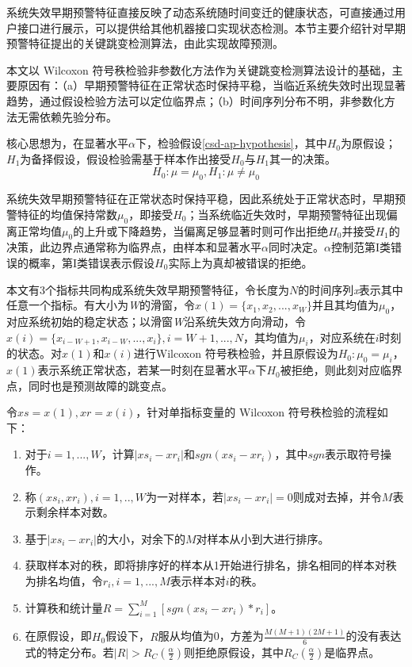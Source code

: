 系统失效早期预警特征直接反映了动态系统随时间变迁的健康状态，可直接通过用户接口进行展示，可以提供给其他机器接口实现状态检测。本节主要介绍针对早期预警特征提出的关键跳变检测算法，由此实现故障预测。

本文以 Wilcoxon 符号秩检验非参数化方法作为关键跳变检测算法设计的基础，主要原因有：（a）早期预警特征在正常状态时保持平稳，当临近系统失效时出现显著趋势，通过假设检验方法可以定位临界点；（b）时间序列分布不明，非参数化方法无需依赖先验分布。

核心思想为，在显著水平$\alpha$下，检验假设\ref{csd-ap-hypothesis}，其中$H_{0}$为原假设；$H_{1}$为备择假设，假设检验需基于样本作出接受$H_{0}$与$H_{1}$其一的决策。
\begin{equation}
\label{csd-ap-hypothesis}
H_{0}: \mu = \mu_{0}, H_{1}:\mu \neq \mu_{0}
\end{equation}

系统失效早期预警特征在正常状态时保持平稳，因此系统处于正常状态时，早期预警特征的均值保持常数$\mu_{0}$，即接受$H_{0}$；当系统临近失效时，早期预警特征出现偏离正常均值$\mu_{0}$的上升或下降趋势，当偏离足够显著时则可作出拒绝$H_{0}$并接受$H_{1}$的决策，此边界点通常称为{\heiti 临界点}，由样本和显著水平$\alpha$同时决定。$\alpha$控制范第I类错误的概率，第I类错误表示假设$H_{0}$实际上为真却被错误的拒绝。

本文有3个指标共同构成系统失效早期预警特征，令长度为$N$的时间序列\emph{x}表示其中任意一个指标。有大小为\emph{W}的滑窗，令$x(1) = \{x_{1}, x_{2}, ..., x_{W}\}$并且其均值为$\mu_{0}$，对应系统初始的稳定状态；以滑窗\emph{W}沿系统失效方向滑动，令$x(i) = \{x_{i-W+1}, x_{i-W}, ..., x_{i}\}, i=W+1,...,N$，其均值为$\mu_{i}$，对应系统在$i$时刻的状态。对$x(1)$和$x(i)$进行Wilcoxon 符号秩检验，并且原假设为$H_{0}: \mu_{0}=\mu_{i}$，$x(1)$表示系统正常状态，若某一时刻在显著水平$\alpha$下$H_{0}$被拒绝，则此刻对应临界点，同时也是预测故障的跳变点。

令$xs = x(1), xr=x(i)$，针对单指标变量的 Wilcoxon 符号秩检验的流程如下：
\begin{enumerate}[1.]
  \item 对于$i=1,...,W$，计算$|xs_{i}-xr_{i}|$和$sgn(xs_{i}-xr_{i})$，其中$sgn$表示取符号操作。
  \item 称$(xs_{i}, xr_{i}), i=1,..,W$为一对样本，若$|xs_{i}-xr_{i}|=0$则成对去掉，并令$M$表示剩余样本对数。
  \item 基于$|xs_{i}-xr_{i}|$的大小，对余下的$M$对样本从小到大进行排序。
  \item 获取样本对的秩，即将排序好的样本从1开始进行排名，排名相同的样本对秩为排名均值，令$r_{i}, i=1,...,M$表示样本对$i$的秩。
  \item 计算秩和统计量$R=\sum_{i=1}^{M}[sgn(xs_{i} - xr_{i})*r_{i}]$。
  \item 在原假设，即$H_{0}$假设下，$R$服从均值为0，方差为$\frac{M(M+1)(2M+1)}{6}$的没有表达式的特定分布。若$|R| > R_{C}(\frac{\alpha}{2})$则拒绝原假设，其中$R_{C}(\frac{\alpha}{2})$是临界点。
\end{enumerate}

